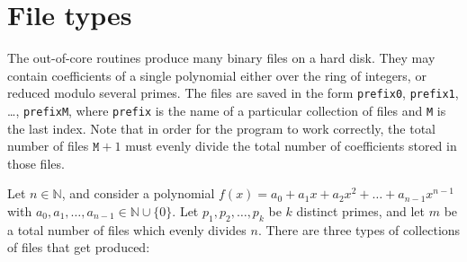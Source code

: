\documentclass[a4paper,10pt]{article}
\newcommand{\code}{\lstinline}
\begin{document}
\section{File types}

The out-of-core routines produce many binary files on a hard disk. They may contain coefficients of a single polynomial either over the ring of integers, or reduced modulo several primes. The files are saved in the form \code{prefix0}, \code{prefix1}, \ldots, \code{prefixM}, where \code{prefix} is the name of a particular collection of files and \code{M} is the last index. Note that in order for the program to work correctly, the total number of files $\texttt{M} + 1$ must evenly divide the total number of coefficients stored in those files.

Let $n \in \mathbb N$, and consider a polynomial $f(x) = a_0 + a_1x + a_2x^2 + \ldots + a_{n-1}x^{n-1}$ with $a_0, a_1, \ldots, a_{n-1} \in \mathbb N \cup \{0\}$. Let $p_1, p_2, \ldots, p_k$ be $k$ distinct primes, and let $m$ be a total number of files which evenly divides $n$. There are three types of collections of files that get produced:
\end{document}
